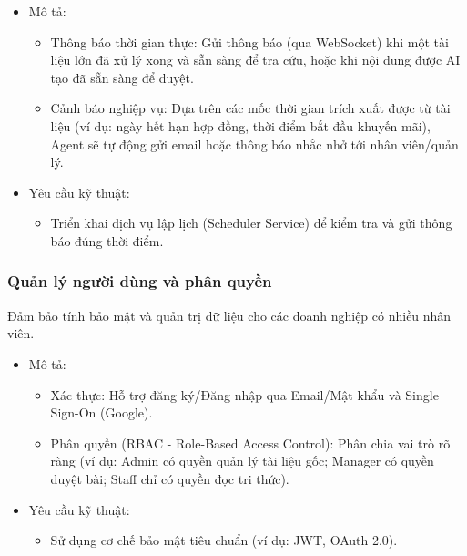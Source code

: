 \begin{itemize}
\item
  Mô tả:

  \begin{itemize}
  \item
    Thông báo thời gian thực: Gửi thông báo (qua WebSocket) khi một tài
    liệu lớn đã xử lý xong và sẵn sàng để tra cứu, hoặc khi nội dung
    được AI tạo đã sẵn sàng để duyệt.
  \item
    Cảnh báo nghiệp vụ: Dựa trên các mốc thời gian trích xuất được từ
    tài liệu (ví dụ: ngày hết hạn hợp đồng, thời điểm bắt đầu khuyến
    mãi), Agent sẽ tự động gửi email hoặc thông báo nhắc nhở tới nhân
    viên/quản lý.
  \end{itemize}
\item
  Yêu cầu kỹ thuật:

  \begin{itemize}
  \item
    Triển khai dịch vụ lập lịch (Scheduler Service) để kiểm tra và gửi
    thông báo đúng thời điểm.
  \end{itemize}
\end{itemize}

\subsubsection{Quản lý người dùng và phân
quyền}\label{quux1ea3n-luxfd-ngux1b0ux1eddi-duxf9ng-vuxe0-phuxe2n-quyux1ec1n}

Đảm bảo tính bảo mật và quản trị dữ liệu cho các doanh nghiệp có nhiều
nhân viên.

\begin{itemize}
\item
  Mô tả:

  \begin{itemize}
  \item
    Xác thực: Hỗ trợ đăng ký/Đăng nhập qua Email/Mật khẩu và Single
    Sign-On (Google).
  \item
    Phân quyền (RBAC - Role-Based Access Control): Phân chia vai trò rõ
    ràng (ví dụ: Admin có quyền quản lý tài liệu gốc; Manager có quyền
    duyệt bài; Staff chỉ có quyền đọc tri thức).
  \end{itemize}
\item
  Yêu cầu kỹ thuật:

  \begin{itemize}
  \item
    Sử dụng cơ chế bảo mật tiêu chuẩn (ví dụ: JWT, OAuth 2.0).
  \end{itemize}
\end{itemize}

